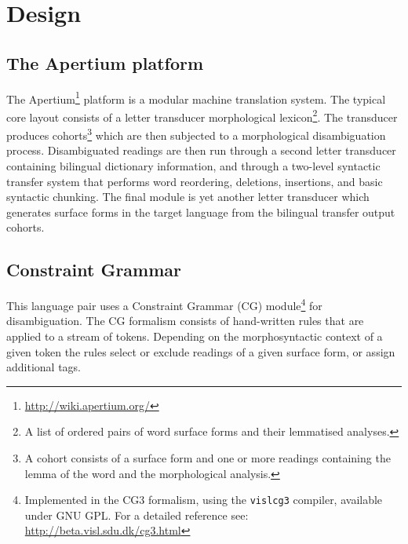 \section{Design}
\subsection{The Apertium platform}
\nocite{forcada2011apertium}
The Apertium\footnote{\url{http://wiki.apertium.org/}} platform is a
modular machine translation system. The typical core layout consists
of a letter transducer morphological lexicon\footnote{A list of
ordered pairs of word surface forms and their lemmatised
analyses.}. The transducer produces cohorts\footnote{A cohort 
consists of a surface form and one or more readings containing the lemma of the 
word and the morphological analysis.} which are then subjected to a
morphological disambiguation process.
%
Disambiguated readings are then run through a second letter transducer
containing bilingual dictionary information, and through a two-level
syntactic transfer system that performs word reordering, deletions,
insertions, and basic syntactic chunking.
%
The final module is yet another letter transducer which generates
surface forms in the target language from the bilingual transfer
output cohorts.

\subsection{Constraint Grammar}
This language pair uses a Constraint Grammar (CG)
module\footnote{Implemented in the CG3 formalism, using the
  \texttt{vislcg3} compiler, available under GNU GPL. For a detailed
  reference see: \url{http://beta.visl.sdu.dk/cg3.html}} for
disambiguation. The CG formalism consists of hand-written rules that
are applied to a stream of tokens. Depending on the morphosyntactic
context of a given token the rules select or exclude readings of a
given surface form, or assign additional tags.
